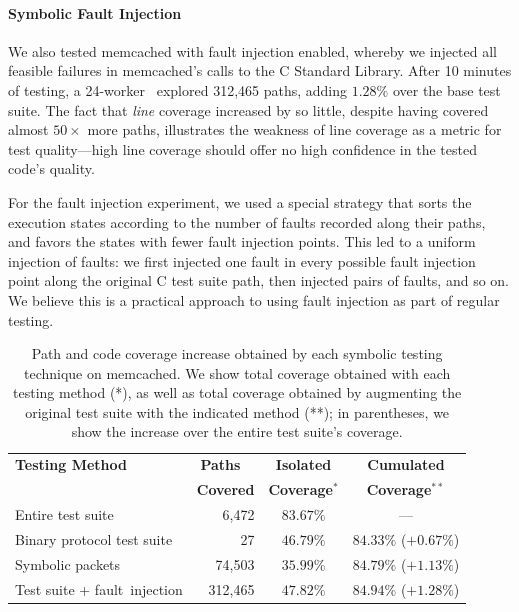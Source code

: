 \paragraph{Symbolic Fault Injection}

We also tested memcached with fault injection enabled, whereby we injected all feasible failures in memcached's calls to the C Standard Library.  After 10 minutes of testing, a 24-worker \cnine\ explored 312,465 paths, adding $1.28\%$ over the base test suite.  The fact that {\em line} coverage increased by so little, despite having covered almost $50\times$ more paths, illustrates the weakness of line coverage as a metric for test quality---high line coverage should offer no high confidence in the tested code's quality.

For the fault injection experiment, we used a special strategy that sorts the execution states according to the number of faults recorded along their paths, and favors the states with fewer fault injection points. This led to a uniform injection of faults: we first injected one fault in every possible fault injection point along the original C test suite path, then injected pairs of faults, and so on.  We believe this is a practical approach to using fault injection as part of regular testing.

\begin{table}
\small
\centering
\addtolength{\tabcolsep}{-1.3pt}
\begin{tabular}{| p{2.3cm} | r | c | c | }
\hline
{\bf Testing Method}   & {\bf Paths}~~       & {\bf Isolated}             & {\bf Cumulated}          \\ 
                                & {\bf  Covered}  & {\bf Coverage$^{*}$} & {\bf Coverage$^{**}$}      \\
\hline
Entire test suite               & 6,472         & $83.67\%$        &---                   \\
\hline
\raggedright Binary protocol test suite      & 27            & $46.79\%$        & $84.33\%$ ($+0.67\%$) \\
\hline
Symbolic packets                & 74,503        & $35.99\%$        & $84.79\%$ ($+1.13\%$) \\
\hline
\raggedright Test suite + fault~injection    & 312,465       & $47.82\%$        & $84.94\%$ ($+1.28\%$) \\
\hline
\end{tabular}
\caption{Path and code coverage increase obtained by each symbolic testing technique on memcached. We show total coverage obtained with each testing method (*), as well as total coverage obtained by augmenting the original test suite with the indicated method  (**); in parentheses, we show the increase over the entire test suite's coverage.}
\label{table:memcached}
\end{table}

